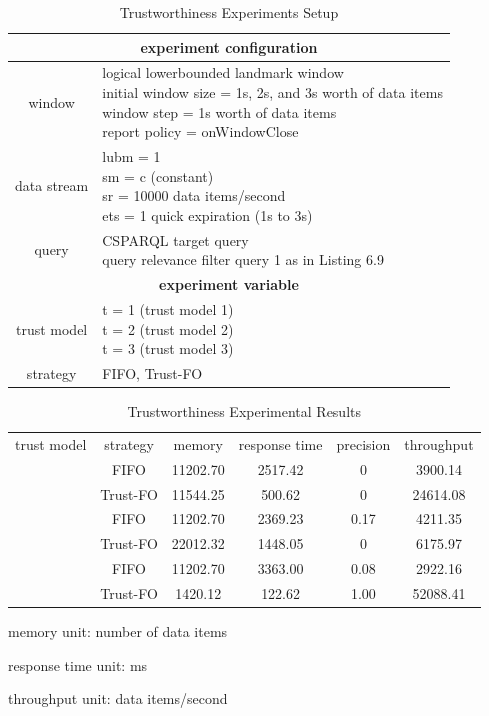 \begin{table}[!htbp]
	\centering
    \caption{Trustworthiness Experiments Setup}
    \label{tab:6-tes}
    \begin{tabular}{|c|l|} \hline
    \multicolumn{2}{|c|}{\textbf{experiment configuration}} \\ \hline
    window & \makecell[l]{logical lowerbounded landmark window \\ initial window size = 1s, 2s, and 3s worth of data items \\ window step = 1s worth of data items \\ report policy = onWindowClose} \\ \hline
    data stream & \makecell[l]{lubm = 1 \\ sm = c (constant) \\ sr = 10000 data items/second \\ ets = 1 quick expiration (1s to 3s)} \\ \hline
    query & \makecell[l]{CSPARQL target query \\ query relevance filter query 1 as in Listing 6.9} \\ \hline
    \multicolumn{2}{|c|}{\textbf{experiment variable}} \\ \hline
    trust model & \makecell[l]{t = 1 (trust model 1) \\ t = 2 (trust model 2) \\ t = 3 (trust model 3)} \\ \hline
    strategy & FIFO, Trust-FO  \\ \hline
    \end{tabular}
\end{table}

\begin{table}[!htbp]
	\centering
    \caption{Trustworthiness Experimental Results}
    \label{tab:6-tp}
    \begin{tabular}{|c||c|c|c|c|c|} \hline
    trust model & strategy & memory & response time & precision & throughput \\ \hhline{|=#=|=|=|=|=|}
    \multirow{2}{*}{Model 1} & FIFO & 11202.70 & 2517.42 & 0 & 3900.14 \\ \cline{2-6} 
    						 & Trust-FO & 11544.25 & 500.62 & 0 & 24614.08 \\ \hhline{|=#=|=|=|=|=|}
    \multirow{2}{*}{Model 2} & FIFO & 11202.70 & 2369.23 & 0.17 & 4211.35 \\ \cline{2-6} 
    						 & Trust-FO & 22012.32 & 1448.05 & 0 & 6175.97 \\ \hhline{|=#=|=|=|=|=|}
    \multirow{2}{*}{Model 3} & FIFO & 11202.70 & 3363.00 & 0.08 & 2922.16 \\ \cline{2-6} 
    						 & Trust-FO & 1420.12 & 122.62 & 1.00 & 52088.41\\ \hline 
    \end{tabular}
    \begin{tablenotes}
 		\item memory unit: number of data items
 		\item response time unit: ms
 		\item throughput unit: data items/second
    \end{tablenotes}
\end{table}

